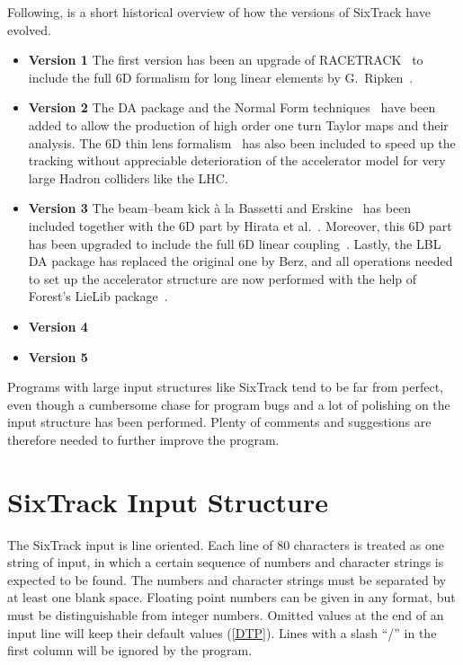 Following, is a short historical overview of how the versions of SixTrack have evolved.
\begin{itemize}
    \item \textbf{Version 1}
        The first version has been an upgrade of RACETRACK~\cite{RACETRACK} to include the full 6D formalism for long linear elements by G.~Ripken~\cite{Ripken85}.
    \item \textbf{Version 2}
        The DA package and the Normal Form techniques~\cite{Berz89,Forest89} have been added to allow the production of high order one turn Taylor maps and their analysis.
        The 6D thin lens formalism~\cite{Ripken95} has also been included to speed up the tracking without appreciable deterioration of the accelerator model for very large Hadron colliders like the LHC.
    \item \textbf{Version 3}
        The beam--beam kick \`a la Bassetti and Erskine~\cite{BasErs} has been included together with the 6D part by Hirata et al.~\cite{Hirata}.
        Moreover, this 6D part has been upgraded to include the full 6D linear coupling~\cite{ripbeam}.
        Lastly, the LBL DA package has replaced the original one by Berz, and all operations needed to set up the accelerator structure are now performed with the help of Forest's LieLib package~\cite{DALIE}.
    \item \textbf{Version 4}
    \item \textbf{Version 5}
\end{itemize}

Programs with large input structures like SixTrack tend to be far from perfect, even though a cumbersome chase for program bugs and a lot of polishing on the input structure has been performed.
Plenty of comments and suggestions are therefore needed to further improve the program.

\section{SixTrack Input Structure}

The SixTrack input is line oriented.
Each line of 80 characters is treated as one string of input, in which a certain sequence of numbers and character strings is expected to be found.
The numbers and character strings must be separated by at least one blank space.
Floating point numbers can be given in any format, but must be distinguishable from integer numbers.
Omitted values at the end of an input line will keep their default values (\ref{DTP}).
Lines with a slash ``/'' in the first column will be ignored by the program.

